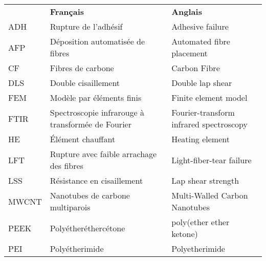\begin{longtable}{p{0.75in}>{\raggedright\arraybackslash}p{2.5in} p{2.5in}}
	      & \textbf{Français}                                                     & \textbf{Anglais}                                                         \\
	ADH   & Rupture de l'adhésif                                                  & Adhesive failure                                                         \\
	AFP   & Déposition automatisée de fibres                                      & Automated fibre placement                                                \\
	CF    & Fibres de carbone                                                     & Carbon Fibre                                                             \\
	DLS   & Double cisaillement                                                   & Double lap shear                                                         \\
	FEM   & Modèle par éléments finis                                             & Finite element model                                                     \\
	FTIR  & Spectroscopie infrarouge à transformée de Fourier                     & Fourier-transform infrared spectroscopy                                  \\
	HE    & Élément chauffant                                                     & Heating element                                                          \\
	LFT   & Rupture avec faible arrachage des fibres                              & Light-fiber-tear failure                                                 \\
	LSS   & Résistance en cisaillement                                            & Lap shear strength                                                       \\
	MWCNT & Nanotubes de carbone multiparois                                      & Multi-Walled Carbon Nanotubes                                            \\
	PEEK  & Polyétheréthercétone                                                  & poly(ether ether ketone)                                                 \\
	PEI   & Polyétherimide                                                        & Polyetherimide                                                           \\

\end{longtable}
